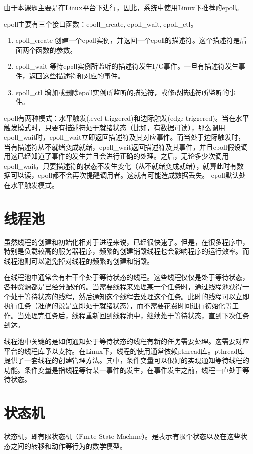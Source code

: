 \documentclass[twoside, xetex]{report}
\begin{document}
	由于本课题主要是在Linux平台下进行，因此，系统中使用Linux下推荐的epoll。
	
	epoll主要有三个接口函数：epoll\_create, epoll\_wait, epoll\_ctl。
	\begin{enumerate}
		\item epoll\_create 创建一个epoll实例，并返回一个epoll的描述符。这个描述符是后面两个函数的参数。
		\item epoll\_wait 等待epoll实例所监听的描述符发生I/O事件。一旦有描述符发生事件，返回这些描述符和对应的事件。
		\item epoll\_ctl 增加或删除epoll实例所监听的描述符，或修改描述符所监听的事件。
	\end{enumerate}
	
	epoll有两种模式：水平触发(level-triggered)和边际触发(edge-triggered)。当在水平触发模式时，只要有描述符处于就绪状态（比如，有数据可读），那么调用epoll\_wait时，epoll\_wait立即返回描述符及其对应事件。而当处于边际触发时，当有描述符从不就绪变成就绪，epoll\_wait返回描述符及其事件，并且epoll假设调用这已经知道了事件的发生并且会进行正确的处理。之后，无论多少次调用epoll\_wait，只要描述符的状态不发生变化（从不就绪变成就绪），就算此时有数据可以读，epoll都不会再次提醒调用者。这就有可能造成数据丢失。
	epoll默认处在水平触发模式。
	
\section{线程池}
	虽然线程的创建和初始化相对于进程来说，已经很快速了。但是，在很多程序中，特别是负载较高的服务器程序，频繁的创建销毁线程也会影响程序的运行效率。而线程池则可以避免掉对线程的频繁的创建和销毁。
	
	在线程池中通常会有若干个处于等待状态的线程。这些线程仅仅是处于等待状态，各种资源都是已经分配好的。当需要线程来处理某一个任务时，通过线程池获得一个处于等待状态的线程，然后通知这个线程去处理这个任务。此时的线程可以立即执行任务（准确的说是立即处于就绪状态），而不需要花费时间进行初始化等工作。当处理完任务后，线程重新回到线程池中，继续处于等待状态，直到下次任务到达。
	
	线程池中关键的是如何通知处于等待状态的线程有新的任务需要处理。这需要对应平台的线程库予以支持。在Linux下，线程的使用通常依赖pthread库。pthread库提供了一套线程的创建管理方法。其中，条件变量可以很好的实现通知等待线程的功能。条件变量是指线程等待某一事件的发生，在事件发生之前，线程一直处于等待状态。

\section{状态机}
	状态机，即有限状态机（Finite State Machine）。是表示有限个状态以及在这些状态之间的转移和动作等行为的数学模型。
	
\end{document}
